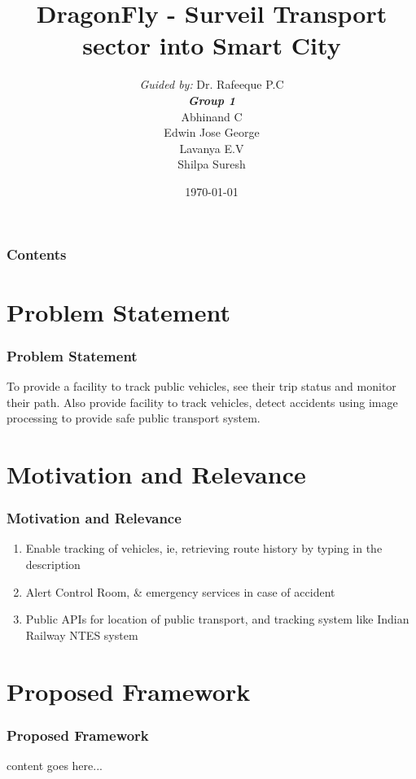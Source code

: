 \documentclass{beamer}
\title[DragonFly]{DragonFly - Surveil Transport sector into Smart City}
\author[Group1]{
	{\small \textit{Guided by:}} Dr. Rafeeque P.C \\
	\medskip
	{\small \textbf{\textit{Group 1}}} \\
	Abhinand C \\
	Edwin Jose George \\
	Lavanya E.V \\
	Shilpa Suresh
}
\institute[GCEK]{Government College of Engineering Kannur}
\date{\today}
\begin{document}
\begin{frame}
\titlepage
\end{frame}

\begin{frame}
\frametitle{Contents}
\tableofcontents
\end{frame}


\section{Problem Statement}
\begin{frame}
	\frametitle{Problem Statement}
	To provide a facility to track public vehicles, see their trip status and monitor their path. Also provide facility to track vehicles, detect accidents using image processing to provide safe public transport system. 
\end{frame}

\section{Motivation and Relevance}
\begin{frame}
	\frametitle{Motivation and Relevance}
	\begin{enumerate}
		\item Enable tracking of vehicles, ie, retrieving route history by typing in the description
		\item Alert Control Room, \& emergency services in case of accident
		\item Public APIs for location of public transport, and tracking system like Indian Railway NTES system
	\end{enumerate}
	
\end{frame}


\section{Proposed Framework}
\begin{frame}
	\frametitle{Proposed Framework}
	content goes here...
\end{frame}
\end{document}
